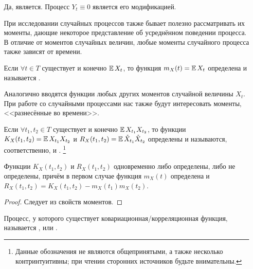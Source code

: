 \begin{solution}
    Да, является.
    Процесс $ Y_t \equiv 0 $ является его модификацией.
\end{solution}


При исследовании случайных процессов также бывает полезно рассматривать их моменты,
дающие некоторое представление об усреднённом поведении процесса.
В отличие от моментов случайных величин, любые моменты случайного процесса также зависят от времени.

\begin{definition}
    \label{definition:basics:mean_function}
    Если $ \forall t \in T $ существует и конечно $ \operatorname{\mathbb{E}} X_t $,
    то функция $ m_X(t) = \operatorname{\mathbb{E}} X_t $ определена и называется .
\end{definition}

Аналогично вводятся функции любых других моментов случайной величины $ X_t $.
При работе со случайными процессами нас также будут интересовать моменты,
<<разнесённые во времени>>.

\begin{definition}
    \label{definition:basics:second_order_moment_functions}
    Если $ \forall t_1, t_2 \in T $ существует и конечно $ \operatorname{\mathbb{E}} X_{t_1} X_{t_2} $,
    то функции $ K_X(t_1, t_2) = \operatorname{\mathbb{E}} X_{t_1} X_{t_2} $ и $ R_X(t_1, t_2) = \operatorname{\mathbb{E}} \mathring{X}_{t_1} \mathring{X}_{t_2} $
    определены и называются, соответственно,  и .%
    \footnote{Данные обозначения не являются общепринятыми, а также несколько контринтуитивны; при чтении сторонних источников будьте внимательны.}
\end{definition}

\begin{statement}
    \label{statement:basics:correlation_and_covariation_connection}
    Функции $ K_X(t_1, t_2) $ и $ R_X(t_1, t_2) $ одновременно либо определены, либо не определены,
    причём в первом случае функция $ m_X(t) $ определена и $ R_X(t_1, t_2) = K_X(t_1, t_2) - m_X(t_1) m_X(t_2) $.
\end{statement}

\begin{proof}
    Следует из свойств моментов.
\end{proof}

\begin{definition}
    \label{definition:basics:L2_process}
    Процесс, у которого существует ковариационная/корреляционная функция, называется ,
    или .
\end{definition}

